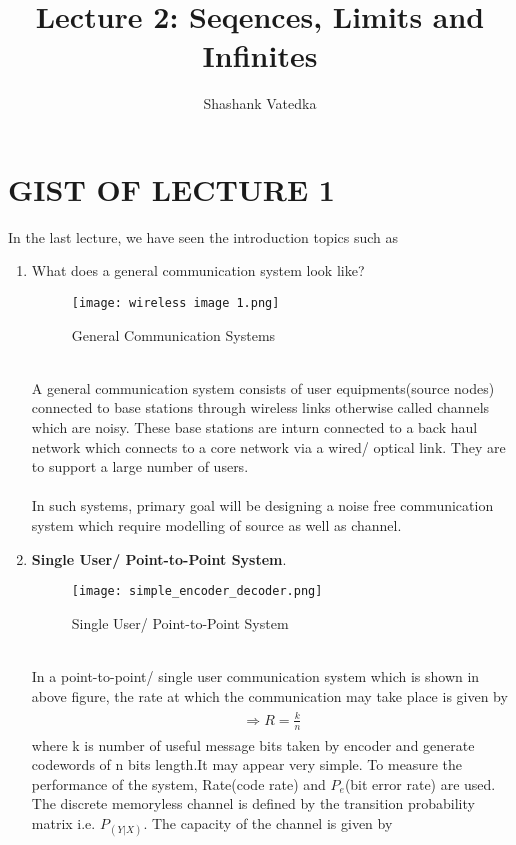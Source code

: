 \documentclass[a4paper]{article}
\title{Lecture 2: Seqences, Limits and Infinites}
\author{Shashank Vatedka}
\begin{document}

\section{GIST OF LECTURE 1}
In the last lecture, we have seen the introduction topics such as\\
\begin{enumerate}
\item	What does a general communication system look like?
\begin{figure}[!ht]
\centering
\texttt{[image: wireless image 1.png]}
\caption{General Communication Systems}\label{fig:1}
\end{figure} \\
A general communication system consists of user equipments(source nodes) connected to base stations through wireless links otherwise called channels which are noisy. These base stations are inturn connected to a back haul network which connects to a core network via a wired/ optical link. They are to support a large number of users.\\
\\
In such systems, primary goal will be designing a noise free communication system which require modelling of source as well as channel. 
\\
\item \textbf{Single User/ Point-to-Point System}.\\
\begin{figure}[!ht]
\centering
\texttt{[image: simple\_encoder\_decoder.png]}
\caption{Single User/ Point-to-Point System}\label{fig:2}
\end{figure} \\
In a point-to-point/ single user communication system which is shown in above figure, the rate at which the communication may take place is given by
\begin{align}
\begin{split}
	\Rightarrow R = \frac{k}{n}
\end{split}
\end{align}
where k is number of useful message bits taken by encoder and generate codewords of n bits length.It may appear very simple. To measure the performance of the system, Rate(code rate) and $P_e$(bit error rate) are used. The discrete memoryless channel is defined by the transition probability matrix i.e. $P_{(Y|X)}$. The capacity of the channel is given by\\

\end{enumerate}
\end{document}
